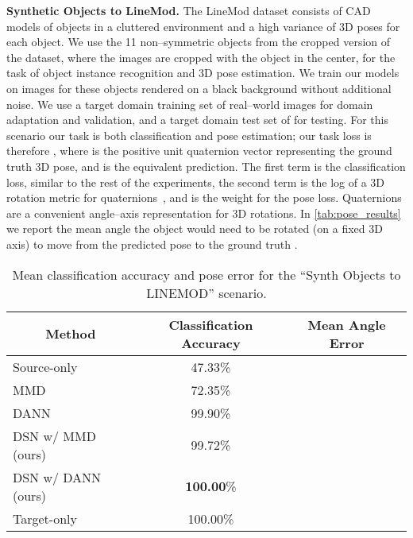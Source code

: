 \documentclass{article}
\begin{document}
\textbf{Synthetic Objects to LineMod.} The LineMod dataset \cite{wohlhart2015learning} consists of CAD models of objects in a cluttered environment and a high variance of 3D poses for each object. We use the 11 non--symmetric objects from the cropped version of the dataset, where the images are cropped with the object in the center, for the task of object instance recognition and 3D pose estimation. We train our models on  images for these objects rendered on a black background without additional noise. We use a target domain training set of  real--world images for domain adaptation and validation, and a target domain test set of  for testing. For this scenario our task is both classification and pose estimation; our task loss is therefore ,
where  is the positive unit quaternion vector representing the ground truth 3D pose, and  is the equivalent prediction. The first term is the classification loss, similar to the rest of the experiments, the second term is the log of a 3D rotation metric for quaternions~\cite{huynh2009metrics}, and  is the weight for the pose loss. Quaternions are a convenient angle--axis representation for 3D rotations. In \autoref{tab:pose_results} we report the mean angle the object would need to be rotated (on a fixed 3D axis) to move from the predicted pose to the ground truth \cite{hinterstoisser2012accv}.



\begin{table}[]
\centering
\caption{Mean classification accuracy and pose error for the ``Synth Objects to LINEMOD'' scenario. }
\label{tab:pose_results}
\begin{tabular}{@{}|l|c|c|@{}}
\hline
\multicolumn{1}{|c|}{\textbf{Method}} & \multicolumn{1}{c|}{\textbf{Classification Accuracy}} & \multicolumn{1}{c|}{\textbf{Mean Angle Error}} \\ \hline \hline
Source-only                           & 47.33\%                                   & \\\hline  \hline
MMD                                   & 72.35\%                                        &                               \\ \hline
DANN                                  & 99.90\%                                               &                 \\ \hline\hline
DSN w/ MMD (ours)                     & 99.72\%                                            &\\ \hline
DSN w/ DANN (ours)                    & \textbf{100.00}\%                                           & \\ \hline\hline
Target-only                           & 100.00\%                                              &                                  \\ \hline
\end{tabular}
\end{table}
\end{document}
